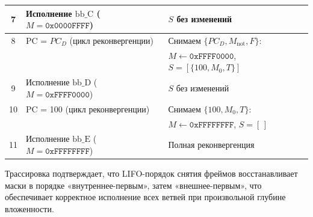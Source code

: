 \begin{table}[h]
\begin{tabular}{cp{4.5cm}p{9cm}}
    \midrule
    7 & Исполнение $\mathrm{bb\_C}$ ($M = \texttt{0x0000FFFF}$)
      & $S$ без изменений \\
    \midrule
    8 & PC = $PC_D$ (цикл реконвергенции)
      & Снимаем $\{PC_D, M_{\mathrm{not}}, F\}$: \\
    & & $M \leftarrow \texttt{0xFFFF0000}$,
        $S = [\{100, M_0, T\}]$ \\
    \midrule
    9 & Исполнение $\mathrm{bb\_D}$ ($M = \texttt{0xFFFF0000}$)
      & $S$ без изменений \\
    \midrule
    10 & PC = 100 (цикл реконвергенции)
       & Снимаем $\{100, M_0, T\}$: \\
    & & $M \leftarrow \texttt{0xFFFFFFFF}$, $S = [\,]$ \\
    \midrule
    11 & Исполнение $\mathrm{bb\_E}$ ($M = \texttt{0xFFFFFFFF}$)
       & Полная реконвергенция \\
    \bottomrule
  \end{tabular}
\end{table}

Трассировка подтверждает, что LIFO-порядок снятия фреймов восстанавливает
маски в порядке «внутреннее-первым», затем «внешнее-первым», что
обеспечивает корректное исполнение всех ветвей при произвольной
глубине вложенности.

